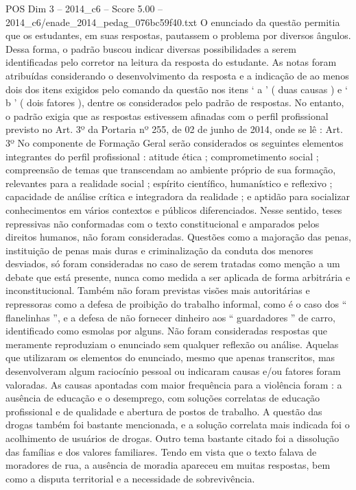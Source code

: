 \begin{textsample}{POS Dim 3 – 2014\_c6 – Score 5.00 – 2014\_c6/enade\_2014\_pedag\_076bc59f40.txt}
O enunciado da questão permitia que os estudantes, em suas respostas, pautassem o problema por diversos ângulos.
Dessa forma, o padrão buscou indicar diversas possibilidades a serem identificadas pelo corretor na leitura da resposta do estudante.
As notas foram atribuídas considerando o desenvolvimento da resposta e a indicação de ao menos dois dos itens exigidos pelo comando da questão nos itens ‘ a ’ ( duas causas ) e ‘ b ’ ( dois fatores ), dentre os considerados pelo padrão de respostas.
No entanto, o padrão exigia que as respostas estivessem afinadas com o perfil profissional previsto no Art. 3º da Portaria nº 255, de 02 de junho de 2014, onde se lê : Art. 3º No componente de Formação Geral serão considerados os seguintes elementos integrantes do perfil profissional : atitude ética ; comprometimento social ; compreensão de temas que transcendam ao ambiente próprio de sua formação, relevantes para a realidade social ; espírito científico, humanístico e reflexivo ; capacidade de análise crítica e integradora da realidade ; e aptidão para socializar conhecimentos em vários contextos e públicos diferenciados.
Nesse sentido, teses repressivas não conformadas com o texto constitucional e amparados pelos direitos humanos, não foram consideradas.
Questões como a majoração das penas, instituição de penas mais duras e criminalização da conduta dos menores desviados, só foram consideradas no caso de serem tratadas como menção a um debate que está presente, nunca como medida a ser aplicada de forma arbitrária e inconstitucional.
Também não foram previstas visões mais autoritárias e repressoras como a defesa de proibição do trabalho informal, como é o caso dos “ flanelinhas ”, e a defesa de não fornecer dinheiro aos “ guardadores ” de carro, identificado como esmolas por alguns.
Não foram consideradas respostas que meramente reproduziam o enunciado sem qualquer reflexão ou análise.
Aquelas que utilizaram os elementos do enunciado, mesmo que apenas transcritos, mas desenvolveram algum raciocínio pessoal ou indicaram causas e/ou fatores foram valoradas.
As causas apontadas com maior frequência para a violência foram : a ausência de educação e o desemprego, com soluções correlatas de educação profissional e de qualidade e abertura de postos de trabalho.
A questão das drogas também foi bastante mencionada, e a solução correlata mais indicada foi o acolhimento de usuários de drogas.
Outro tema bastante citado foi a dissolução das famílias e dos valores familiares.
Tendo em vista que o texto falava de moradores de rua, a ausência de moradia apareceu em muitas respostas, bem como a disputa territorial e a necessidade de sobrevivência.

\end{textsample}
